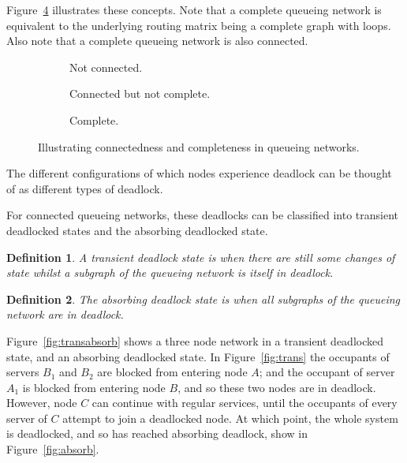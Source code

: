 \documentclass{article}
\newtheorem{definition}{Definition}
\begin{document}
Figure~\ref{fig:connectedcomplete} illustrates these concepts.
Note that a complete queueing network is equivalent to the underlying routing matrix being a complete graph with loops.
Also note that a complete queueing network is also connected.

\begin{figure}[!htbp]
\begin{center}
\begin{subfigure}[b]{0.3\textwidth}
  
  \caption{Not connected.}
  \label{fig:connected}
\end{subfigure}
\begin{subfigure}[b]{0.3\textwidth}
  
  \caption{Connected but not complete.}
  \label{fig:notconnected}
\end{subfigure}
\begin{subfigure}[b]{0.3\textwidth}
  
  \caption{Complete.}
  \label{fig:complete}
\end{subfigure}
\end{center}
\caption{Illustrating connectedness and completeness in queueing networks.}
\label{fig:connectedcomplete}
\end{figure}

The different configurations of which nodes experience deadlock can be thought
of as different types of deadlock.

For connected queueing networks, these deadlocks can be classified into transient deadlocked states and the absorbing deadlocked state.\\


\begin{definition}
    A transient deadlock state is when there are still some changes of state
    whilst a subgraph of the queueing network is itself in deadlock.\\
\end{definition}

\begin{definition}
    The absorbing deadlock state is when all subgraphs of the
    queueing network are in deadlock.\\
\end{definition}

Figure~\ref{fig:transabsorb} shows a three node network in a transient deadlocked state, and an absorbing deadlocked state.
In Figure~\ref{fig:trans} the occupants of servers $B_1$ and $B_2$ are blocked from entering node $A$; and the occupant of server $A_1$ is blocked from entering node $B$, and so these two nodes are in deadlock.
However, node $C$ can continue with regular services, until the occupants of every server of $C$ attempt to join a deadlocked node.
At which point, the whole system is deadlocked, and so has reached absorbing deadlock, show in Figure~\ref{fig:absorb}.
\end{document}
